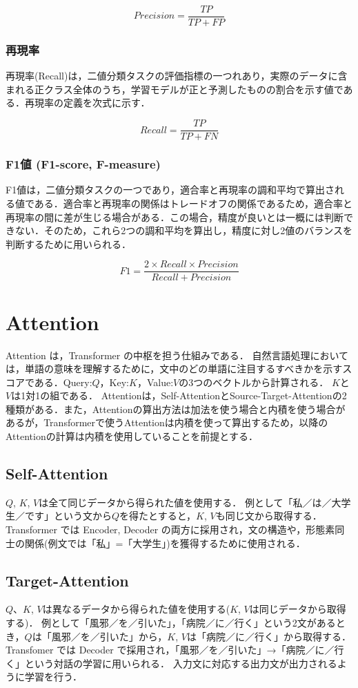 $$
Precision = \frac{TP}{TP+FP}
$$


\subsubsection{再現率 \label{c4s2-1c}}
再現率(Recall)は，二値分類タスクの評価指標の一つれあり，実際のデータに含まれる正クラス全体のうち，学習モデルが正と予測したものの割合を示す値である．再現率の定義を次式に示す．

$$
Recall = \frac{TP}{TP+FN}
$$

\subsubsection{F1値 (F1-score, F-measure) \label{c4s2-1d}}
F1値は，二値分類タスクの一つであり，適合率と再現率の調和平均で算出される値である．適合率と再現率の関係はトレードオフの関係であるため，適合率と再現率の間に差が生じる場合がある．この場合，精度が良いとは一概には判断できない．そのため，これら2つの調和平均を算出し，精度に対し2値のバランスを判断するために用いられる．

$$
F1 = \frac{2 \times Recall \times Precision}{Recall+Precision}
$$


\section{Attention \label{c4s3}}
Attention は，Transformer の中枢を担う仕組みである．
自然言語処理においては，単語の意味を理解するために，文中のどの単語に注目するすべきかを示すスコアである．Query:${Q}$，Key:${K}$，Value:${V}$の3つのベクトルから計算される．
${K}$と${V}$は1対1の組である．
Attentionは，Self-AttentionとSource-Target-Attentionの2種類がある．また，Attentionの算出方法は加法を使う場合と内積を使う場合があるが，Transformerで使うAttentionは内積を使って算出するため，以降のAttentionの計算は内積を使用していることを前提とする．

\subsection{Self-Attention \label{c4s3-1a}}
${Q}$, ${K}$, ${V}$は全て同じデータから得られた値を使用する．
例として「私／は／大学生／です」という文から${Q}$を得たとすると，${K}$, ${V}$も同じ文から取得する．Transformer では Encoder, Decoder の両方に採用され，文の構造や，形態素同士の関係(例文では「私」=「大学生」)を獲得するために使用される．

\subsection{Target-Attention \label{c4s3-1b}}
${Q}$、${K}$, ${V}$は異なるデータから得られた値を使用する(${K}$, ${V}$は同じデータから取得する)．
例として「風邪／を／引いた」，「病院／に／行く」という2文があるとき，${Q}$は「風邪／を／引いた」から，${K}$, ${V}$は「病院／に／行く」から取得する．
 Transfomer では Decoder で採用され，「風邪／を／引いた」→「病院／に／行く」という対話の学習に用いられる．
入力文に対応する出力文が出力されるように学習を行う．

